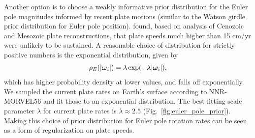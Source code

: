 \documentclass[11pt,letterpaper]{article}
\newcommand{\mitbf}[1]{\hbox{\mathversion{bold}$#1$}}
\begin{document}
Another option is to choose a weakly informative prior distribution for the Euler pole magnitudes informed by recent plate motions (similar to the Watson girdle prior distribution for Euler pole position). \citet{Zahirovic2015a} found, based on analysis of Cenozoic and Mesozoic plate reconstructions, that plate speeds much higher than 15 cm/yr were unlikely to be sustained. A reasonable choice of distribution for strictly positive numbers is the exponential distribution, given by
\begin{equation}
\rho_E(\vert \mitbf{\omega}_i \vert) = \lambda \exp(-\lambda \vert \mitbf{\omega}_i \vert),
\end{equation}
which has higher probability density at lower values, and falls off exponentially. We sampled the current plate rates on Earth's surface according to NNR-MORVEL56 and fit those to an exponential distribution. The best fitting scale parameter $\lambda$ for current plate rates is $\lambda\approx2.5$ (Fig.~\ref{fig:euler_pole_prior}). Making this choice of prior distribution for Euler pole rotation rates can be seen as a form of regularization on plate speeds.
\end{document}
